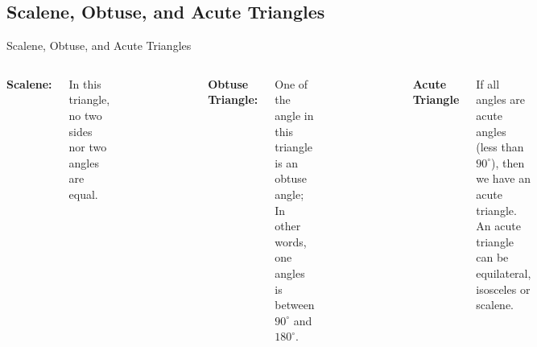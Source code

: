 \subsection{Scalene, Obtuse, and Acute Triangles}
\begin{frame}[t]{Scalene, Obtuse, and Acute Triangles}
    \begin{columns}[t]
        \textbf{Scalene:} 
        
        In this triangle, no two sides nor two angles are equal. 
        \begin{figure}[H]
            \centering
            \label{fig:scalene_triangle}
        \end{figure}
        \textbf{Obtuse Triangle:} 
        
        One of the angle in this triangle is an obtuse angle; In other words, one angles is between $90^\circ$ and $180^\circ$.
        \begin{figure}[H]
            \centering
            \label{fig:obtuse_triangle}
        \end{figure}  
        \textbf{Acute Triangle}
        
        If all angles are acute angles (less than $90^\circ$), then we have an acute triangle.
        An acute triangle can be equilateral, isosceles or scalene.
        

\end{columns}
\end{frame}

